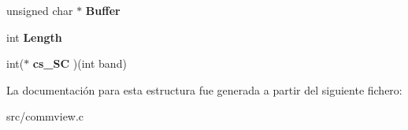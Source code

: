 \begin{DoxyCompactItemize}
\item 
\hypertarget{structcstate_abdde898cee33ccd594a6ac92aa70a95c}{
unsigned char $\ast$ {\bfseries Buffer}}
\label{structcstate_abdde898cee33ccd594a6ac92aa70a95c}

\item 
\hypertarget{structcstate_a76c9d79cfd22595ab33c6c03760f4dfb}{
int {\bfseries Length}}
\label{structcstate_a76c9d79cfd22595ab33c6c03760f4dfb}

\item 
\hypertarget{structcstate_af2373084f3139c77eddacef58192164c}{
int($\ast$ {\bfseries cs\_\-SC} )(int band)}
\label{structcstate_af2373084f3139c77eddacef58192164c}

\end{DoxyCompactItemize}


La documentación para esta estructura fue generada a partir del siguiente fichero:\begin{DoxyCompactItemize}
\item 
src/commview.c\end{DoxyCompactItemize}
